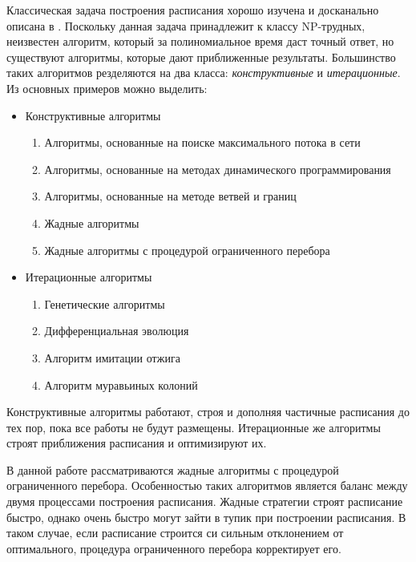 Классическая задача построения расписания хорошо изучена и досканально описана в \cite{Coffman}. Поскольку данная задача принадлежит к классу NP-трудных, неизвестен алгоритм, который за полиномиальное время даст точный ответ, но существуют алгоритмы, которые дают приближенные результаты. Большинство таких алгоритмов резделяются на два класса: \textit{конструктивные} и \textit{итерационные}. Из основных примеров можно выделить:
\begin{itemize}
    \item Конструктивные алгоритмы
    \begin{enumerate}
        \item Алгоритмы, основанные на поиске максимального потока в сети
        \item Алгоритмы, основанные на методах динамического программирования
        \item Алгоритмы, основанные на методе ветвей и границ
        \item Жадные алгоритмы
        \item Жадные алгоритмы с процедурой ограниченного перебора
    \end{enumerate}
    \item Итерационные алгоритмы
    \begin{enumerate}
        \item Генетические алгоритмы
        \item Дифференциальная эволюция
        \item Алгоритм имитации отжига
        \item Алгоритм муравьиных колоний
    \end{enumerate}
\end{itemize}
\par
Конструктивные алгоритмы работают, строя и дополняя частичные расписания до тех пор, пока все работы не будут размещены. Итерационные же алгоритмы строят приближения расписания и оптимизируют их.
\par
В данной работе рассматриваются жадные алгоритмы с процедурой ограниченного перебора. Особенностью таких алгоритмов является баланс между двумя процессами построения расписания. Жадные стратегии строят расписание быстро, однако очень быстро могут зайти в тупик при построении расписания. В таком случае, если расписание строится си сильным отклонением от оптимального, процедура ограниченного перебора корректирует его.